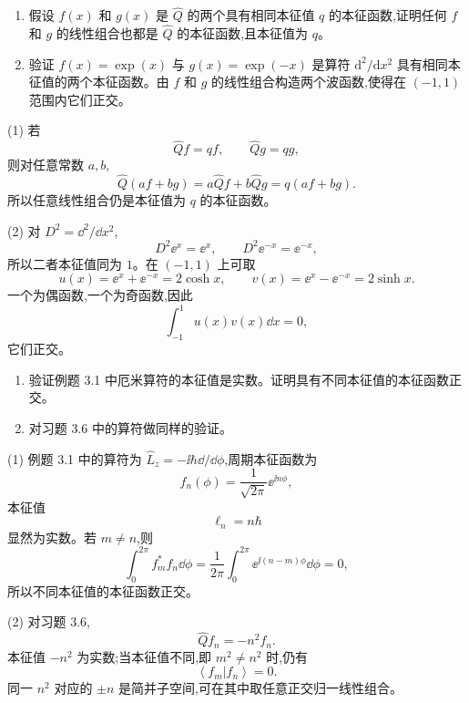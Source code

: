 \begin{question}
\begin{enumerate}
\item 假设 $f(x)$ 和 $g(x)$ 是 $\hat Q$ 的两个具有相同本征值 $q$ 的本征函数,证明任何 $f$ 和 $g$ 的线性组合也都是 $\hat Q$ 的本征函数,且本征值为 $q$。
\item 验证 $f(x)=\exp(x)$ 与 $g(x)=\exp(-x)$ 是算符 $\mathrm d^2/\mathrm dx^2$ 具有相同本征值的两个本征函数。由 $f$ 和 $g$ 的线性组合构造两个波函数,使得在 $(-1,1)$ 范围内它们正交。
\end{enumerate}
\begin{solution}
(1) 若
\[
\hat Q f=qf,
\qquad
\hat Q g=qg,
\]
则对任意常数 $a,b$,
\[
\hat Q(af+bg)=a\hat Qf+b\hat Qg=q(af+bg).
\]
所以任意线性组合仍是本征值为 $q$ 的本征函数。

(2) 对 $D^2=\dd^2/\dd x^2$,
\[
D^2\ee^x=\ee^x,
\qquad
D^2\ee^{-x}=\ee^{-x},
\]
所以二者本征值同为 $1$。在 $(-1,1)$ 上可取
\[
u(x)=\ee^x+\ee^{-x}=2\cosh x,
\qquad
v(x)=\ee^x-\ee^{-x}=2\sinh x.
\]
一个为偶函数,一个为奇函数,因此
\[
\int_{-1}^{1}u(x)v(x)\dd x=0,
\]
它们正交。
\end{solution}
\end{question}

\begin{question}
\begin{enumerate}
\item 验证例题 3.1 中厄米算符的本征值是实数。证明具有不同本征值的本征函数正交。
\item 对习题 3.6 中的算符做同样的验证。
\end{enumerate}
\begin{solution}
(1) 例题 3.1 中的算符为 $\hat L_z=-\ii\hbar\dd/\dd\phi$,周期本征函数为
\[
f_n(\phi)=\frac1{\sqrt{2\pi}}\ee^{\ii n\phi},
\]
本征值
\[
\ell_n=n\hbar
\]
显然为实数。若 $m\ne n$,则
\[
\int_0^{2\pi} f_m^*f_n\dd\phi
=\frac1{2\pi}\int_0^{2\pi}\ee^{\ii(n-m)\phi}\dd\phi=0,
\]
所以不同本征值的本征函数正交。

(2) 对习题 3.6,
\[
\hat Qf_n=-n^2f_n.
\]
本征值 $-n^2$ 为实数;当本征值不同,即 $m^2\ne n^2$ 时,仍有
\[
\left\langle f_m|f_n \right\rangle=0.
\]
同一 $n^2$ 对应的 $\pm n$ 是简并子空间,可在其中取任意正交归一线性组合。
\end{solution}
\end{question}

